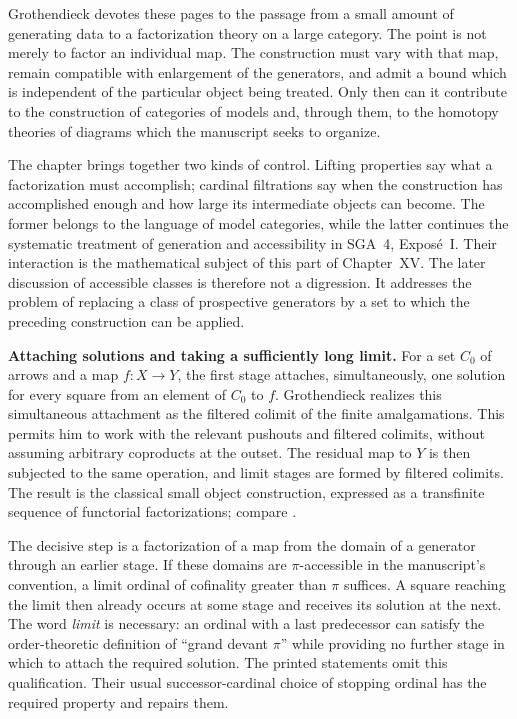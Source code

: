 Grothendieck devotes these pages to the passage from a small amount of generating data to a factorization theory on a large category. The point is not merely to factor an individual map. The construction must vary with that map, remain compatible with enlargement of the generators, and admit a bound which is independent of the particular object being treated. Only then can it contribute to the construction of categories of models and, through them, to the homotopy theories of diagrams which the manuscript seeks to organize.

The chapter brings together two kinds of control. Lifting properties say what a factorization must accomplish; cardinal filtrations say when the construction has accomplished enough and how large its intermediate objects can become. The former belongs to the language of model categories, while the latter continues the systematic treatment of generation and accessibility in SGA~4, Expos\'e~I. Their interaction is the mathematical subject of this part of Chapter~XV. The later discussion of accessible classes is therefore not a digression. It addresses the problem of replacing a class of prospective generators by a set to which the preceding construction can be applied.

\medskip\noindent\textbf{Attaching solutions and taking a sufficiently long limit.}
For a set $C_0$ of arrows and a map $f:X\to Y$, the first stage attaches, simultaneously, one solution for every square from an element of $C_0$ to $f$. Grothendieck realizes this simultaneous attachment as the filtered colimit of the finite amalgamations. This permits him to work with the relevant pushouts and filtered colimits, without assuming arbitrary coproducts at the outset. The residual map to $Y$ is then subjected to the same operation, and limit stages are formed by filtered colimits. The result is the classical small object construction, expressed as a transfinite sequence of functorial factorizations; compare \citet[Chapter~12]{Riehl2014}.

The decisive step is a factorization of a map from the domain of a generator through an earlier stage. If these domains are $\pi$-accessible in the manuscript's convention, a limit ordinal of cofinality greater than $\pi$ suffices. A square reaching the limit then already occurs at some stage and receives its solution at the next. The word \emph{limit} is necessary: an ordinal with a last predecessor can satisfy the order-theoretic definition of ``grand devant $\pi$'' while providing no further stage in which to attach the required solution. The printed statements omit this qualification. Their usual successor-cardinal choice of stopping ordinal has the required property and repairs them.

